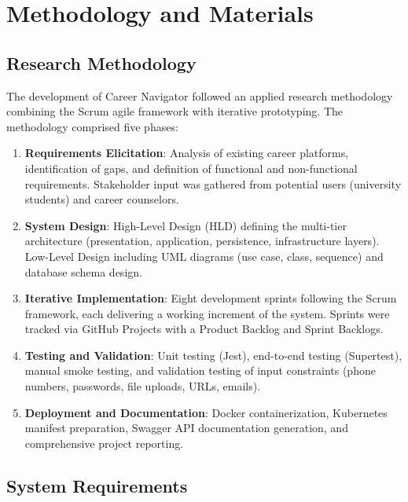 \documentclass[12pt,a4paper]{report}
\begin{document}
\chapter{Methodology and Materials}

\section{Research Methodology}
The development of Career Navigator followed an applied research methodology combining the Scrum agile framework with iterative prototyping. The methodology comprised five phases:

\begin{enumerate}[label=\textbf{Phase \arabic*}:, leftmargin=*]
    \item \textbf{Requirements Elicitation}: Analysis of existing career platforms, identification of gaps, and definition of functional and non-functional requirements. Stakeholder input was gathered from potential users (university students) and career counselors.
    
    \item \textbf{System Design}: High-Level Design (HLD) defining the multi-tier architecture (presentation, application, persistence, infrastructure layers). Low-Level Design including UML diagrams (use case, class, sequence) and database schema design.
    
    \item \textbf{Iterative Implementation}: Eight development sprints following the Scrum framework, each delivering a working increment of the system. Sprints were tracked via GitHub Projects with a Product Backlog and Sprint Backlogs.
    
    \item \textbf{Testing and Validation}: Unit testing (Jest), end-to-end testing (Supertest), manual smoke testing, and validation testing of input constraints (phone numbers, passwords, file uploads, URLs, emails).
    
    \item \textbf{Deployment and Documentation}: Docker containerization, Kubernetes manifest preparation, Swagger API documentation generation, and comprehensive project reporting.
\end{enumerate}

\section{System Requirements}
\end{document}
